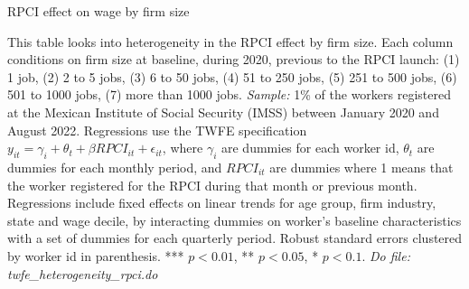 \documentclass[oneside,11pt]{article}
\begin{document}
\begin{landscape}

\begin{table}[H]
    \caption{RPCI effect on wage by firm size}
    \label{twfe_wage_hetero_firm_size}
    \begin{center}
    \scriptsize{}
    \end{center}
\end{table}
\scriptsize{
\noindent This table looks into heterogeneity in the RPCI effect by firm size. Each column conditions on firm size at baseline, during 2020, previous to the RPCI launch: (1) 1 job, (2) 2 to 5 jobs, (3) 6 to 50 jobs, (4) 51 to 250 jobs, (5) 251 to 500 jobs, (6) 501 to 1000 jobs, (7) more than 1000 jobs. \textit{Sample:} 1\% of the workers registered at the Mexican Institute of Social Security (IMSS) between January 2020 and August 2022. Regressions use the TWFE specification $y_{it} = \gamma_{i} + \theta_{t}+ \beta RPCI_{it} +\epsilon_{it}$, where $\gamma_{i}$ are dummies for each worker id, $\theta_{t}$ are dummies for each monthly period, and $RPCI_{it}$ are dummies where 1 means that the worker registered for the RPCI during that month or previous month. Regressions include fixed effects on linear trends for age group, firm industry, state and wage decile, by interacting dummies on worker's baseline characteristics with a set of dummies for each quarterly period. Robust standard errors clustered by worker id in parenthesis. *** $p<0.01$, ** $p<0.05$, * $p<0.1$.
\textit{Do file: twfe\_heterogeneity\_rpci.do}
}

\end{landscape}

\clearpage
\end{document}
